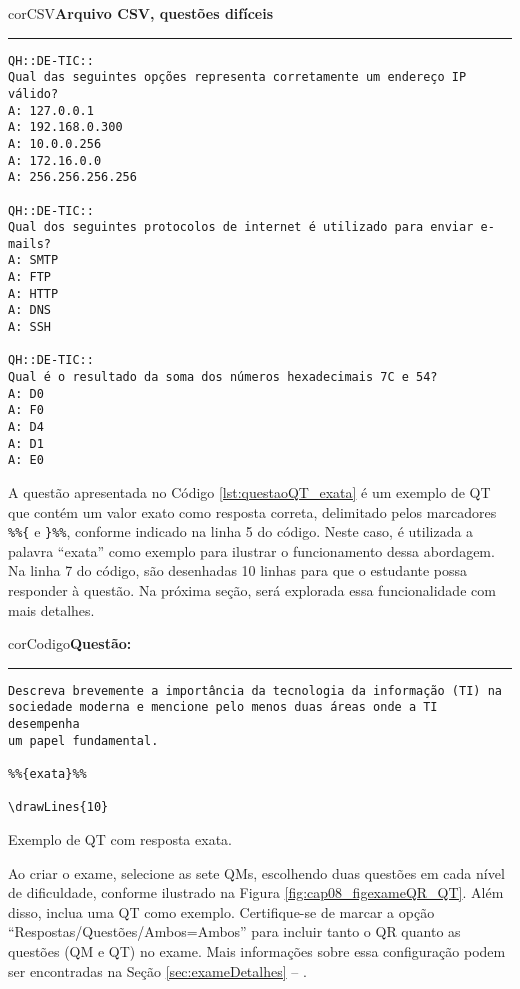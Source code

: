 \begin{myboxCode}{corCSV}{\textbf{Arquivo CSV, questões difíceis}}\vspace{3mm}
\hrule
{\footnotesize
\begin{verbatim}
QH::DE-TIC:: 
Qual das seguintes opções representa corretamente um endereço IP válido?
A: 127.0.0.1
A: 192.168.0.300
A: 10.0.0.256
A: 172.16.0.0
A: 256.256.256.256

QH::DE-TIC::
Qual dos seguintes protocolos de internet é utilizado para enviar e-mails?
A: SMTP
A: FTP
A: HTTP
A: DNS
A: SSH

QH::DE-TIC::
Qual é o resultado da soma dos números hexadecimais 7C e 54?
A: D0
A: F0
A: D4
A: D1
A: E0
\end{verbatim}
}
\end{myboxCode}

A questão apresentada no Código \ref{lst:questaoQT_exata} é um exemplo de QT que contém um valor exato como resposta correta, delimitado pelos marcadores \verb|%%{| e \verb|}%%|, conforme indicado na linha 5 do código. Neste caso, é utilizada a palavra ``exata'' como exemplo para ilustrar o funcionamento dessa abordagem. Na linha 7 do código, são desenhadas 10 linhas para que o estudante possa responder à questão. Na próxima seção, será explorada essa funcionalidade com mais detalhes.

\begin{listing}[!ht]
\begin{myboxCode}{corCodigo}{\textbf{Questão: }}\vspace{3mm}
\hrule
\begin{verbatim}
Descreva brevemente a importância da tecnologia da informação (TI) na 
sociedade moderna e mencione pelo menos duas áreas onde a TI desempenha 
um papel fundamental.

%%{exata}%%

\drawLines{10}
\end{verbatim}
\end{myboxCode}
\caption{Exemplo de QT com resposta exata.}
\label{lst:questaoQT_exata}
\end{listing}



Ao criar o exame, selecione as sete QMs, escolhendo duas questões em cada nível de dificuldade, conforme ilustrado na Figura \ref{fig:cap08_figexameQR_QT}. Além disso, inclua uma QT como exemplo. Certifique-se de marcar a opção ``Respostas/Questões/Ambos=Ambos'' para incluir tanto o QR quanto as questões (QM e QT) no exame. Mais informações sobre essa configuração podem ser encontradas na Seção \ref{sec:exameDetalhes} -- .

